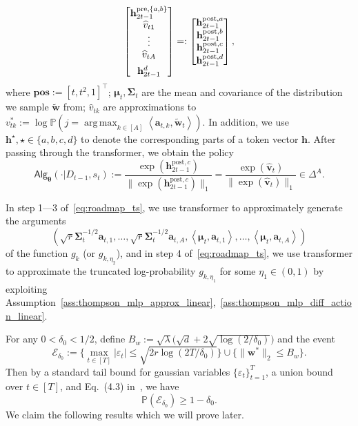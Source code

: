 \documentclass[10pt]{article}
\renewcommand{\hat}{\widehat}
\newcommand{\eps}{\varepsilon}
\DeclareMathOperator*{\argmax}{arg\,max}
\newcommand{\<}{\left\langle}
\renewcommand{\>}{\right\rangle}
\renewcommand{\P}{\mathbb{P}}
\newcommand{\pre}{{\mathrm{pre}}}
\newcommand{\posv}{{\mathbf{pos}}}
\newcommand{\post}{{\mathrm{post}}}
\newcommand{\parta}{{a}}
\newcommand{\partb}{{b}}
\newcommand{\partc}{{c}}
\newcommand{\partd}{{d}}
\newcommand{\Tpsmean}{{{\mathbf\mu}}}
\newcommand{\Tpscov}{{{\mathbf\Sigma}}}
\newcommand{\Tpssam}{{\tilde\bw}}
\newcommand{\Tpsparn}{{r}} %
\newcommand{\trunprob}{{\eta_1}}
\newcommand{\hpevent}{{\mathcal E}}
\newcommand{\Trunregpa}{{\eta_2}}  %
\newcommand{\state}{{s}}
\newcommand{\totlen}{{T}} %
\newcommand{\sAlg}{{\mathsf{Alg}}}
\newcommand{\dset}{{D}}
\newcommand{\tfpar}{{\btheta}}
\def\btheta{{\boldsymbol \theta}}
\def\ba{{\mathbf a}}
\def\bh{{\mathbf h}}
\def\bv{{\mathbf v}}
\def\bw{{\mathbf w}}
\begin{document}
\begin{align}
\begin{bmatrix}
    \bh_{2t-1}^{\pre,\{\parta,\partb\}}\\ \hat v_{t1}\\\vdots\\ \hat{v}_{tA} \vspace{0.5em}\\ \bh_{2t-1}^{\partd}
\end{bmatrix}
=:
\begin{bmatrix}
    \bh_{2t-1}^{\post,\parta} \\  \bh_{2t-1}^{\post,\partb}\\  \bh_{2t-1}^{\post,\partc}\\   \bh_{2t-1}^{\post,\partd}
\end{bmatrix},\notag
\end{align}
where $\posv:=[t,t^2,1]^\top$; $\Tpsmean_t,\Tpscov_t$ are the mean and covariance of the distribution we sample $\tilde\bw$ from; $\hat v_{tk}$ are approximations to $v^*_{tk}:=\log \P(j=\argmax_{k\in[A]}\<\ba_{t,k},\Tpssam_t\>)$. In addition, we use $\bh^\star,\star\in\{\parta,\partb,\partc,\partd\}$ to denote the corresponding parts of a token vector $\bh$. After passing through the transformer, we obtain the policy
$$
\sAlg_\tfpar(\cdot|\dset_{t-1},\state_t):=\frac{\exp(\bh^{\post,\partc}_{2t-1})}{\|\exp(\bh^{\post,\partc}_{2t-1})\|_1}=\frac{\exp(\hat \bv_t)}{\|\exp(\hat \bv_t)\|_1}\in\Delta^A.
$$

In step 1---3 of~\eqref{eq:roadmap_ts},  we use transformer to approximately generate the arguments $$(\sqrt{\Tpsparn}\Tpscov_t^{-1/2}\ba_{t,1},\ldots,\sqrt{\Tpsparn}\Tpscov_t^{-1/2}\ba_{t,A},\<\Tpsmean_t,\ba_{t,1}\>,\ldots,\<\Tpsmean_t,\ba_{t,A}\>)$$ of the function $g_k$ (or $g_{k,\Trunregpa}$), and in step 4 of~\eqref{eq:roadmap_ts}, we use transformer to approximate the truncated log-probability $g_{k,\trunprob}$ for some $\trunprob\in(0,1)$ by exploiting Assumption~\ref{ass:thompson_mlp_approx_linear},~\ref{ass:thompson_mlp_diff_action_linear}.

For any $0<\delta_0<1/2$, define $B_w:=\sqrt{\lambda}\big(\sqrt{d}+2\sqrt{\log(2/\delta_0)}\big)$ and the event $$\hpevent_{\delta_0}:=\{\max_{t\in[T]}|\eps_t|\leq\sqrt{2\Tpsparn\log(2T/\delta_0)}\}\cup \{\|\bw^*\|_2\leq  B_w\}.$$ Then by  a standard tail bound for gaussian variables $\{\eps_t\}_{t=1}^\totlen$,  a union bound over $t\in[T]$, and Eq.~(4.3) in~\cite{laurent2000adaptive}, we have $$\P(\hpevent_{\delta_0})\geq 1-{\delta_0}.$$
We claim the following results which we will prove later.
\end{document}
